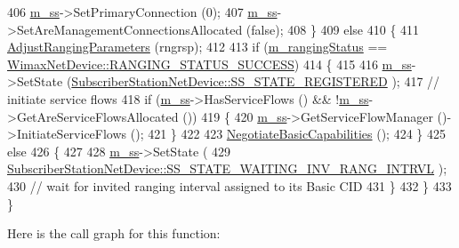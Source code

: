 \begin{DoxyCode}
406       \hyperlink{classns3_1_1SSLinkManager_a44506c63befdc33eb0e0b4ba7f93d498}{m\_ss}->SetPrimaryConnection (0);
407       \hyperlink{classns3_1_1SSLinkManager_a44506c63befdc33eb0e0b4ba7f93d498}{m\_ss}->SetAreManagementConnectionsAllocated (\textcolor{keyword}{false});
408     \}
409   \textcolor{keywordflow}{else}
410     \{
411       \hyperlink{classns3_1_1SSLinkManager_a04e92e6521c11d279b3aff2ef73ce7d4}{AdjustRangingParameters} (rngrsp);
412 
413       \textcolor{keywordflow}{if} (\hyperlink{classns3_1_1SSLinkManager_ae21f07956edc47367365d56c7913eee7}{m\_rangingStatus} == 
      \hyperlink{classns3_1_1WimaxNetDevice_a2a74c0f01e51abc1851a630242e7b591a2a48f503c20971a1a5901af0b6d0746c}{WimaxNetDevice::RANGING\_STATUS\_SUCCESS})
414         \{
415 
416           \hyperlink{classns3_1_1SSLinkManager_a44506c63befdc33eb0e0b4ba7f93d498}{m\_ss}->SetState (\hyperlink{classns3_1_1SubscriberStationNetDevice_af9f145bc05df1f18610a3d4b61ff9ee4a8e471619acd464651860d0d53cc6b56f}{SubscriberStationNetDevice::SS\_STATE\_REGISTERED}
      );
417           \textcolor{comment}{// initiate service flows}
418           \textcolor{keywordflow}{if} (\hyperlink{classns3_1_1SSLinkManager_a44506c63befdc33eb0e0b4ba7f93d498}{m\_ss}->HasServiceFlows () && !\hyperlink{classns3_1_1SSLinkManager_a44506c63befdc33eb0e0b4ba7f93d498}{m\_ss}->GetAreServiceFlowsAllocated ())
419             \{
420               \hyperlink{classns3_1_1SSLinkManager_a44506c63befdc33eb0e0b4ba7f93d498}{m\_ss}->GetServiceFlowManager ()->InitiateServiceFlows ();
421             \}
422 
423           \hyperlink{classns3_1_1SSLinkManager_adaff3605d2ba2cd498ad14adbccefb5d}{NegotiateBasicCapabilities} ();
424         \}
425       \textcolor{keywordflow}{else}
426         \{
427 
428           \hyperlink{classns3_1_1SSLinkManager_a44506c63befdc33eb0e0b4ba7f93d498}{m\_ss}->SetState (
429             \hyperlink{classns3_1_1SubscriberStationNetDevice_af9f145bc05df1f18610a3d4b61ff9ee4aba899a8d6171ee1a9a924dde6c62f16f}{SubscriberStationNetDevice::SS\_STATE\_WAITING\_INV\_RANG\_INTRVL}
      );
430           \textcolor{comment}{// wait for invited ranging interval assigned to its Basic CID}
431         \}
432     \}
433 \}
\end{DoxyCode}


Here is the call graph for this function\+:


